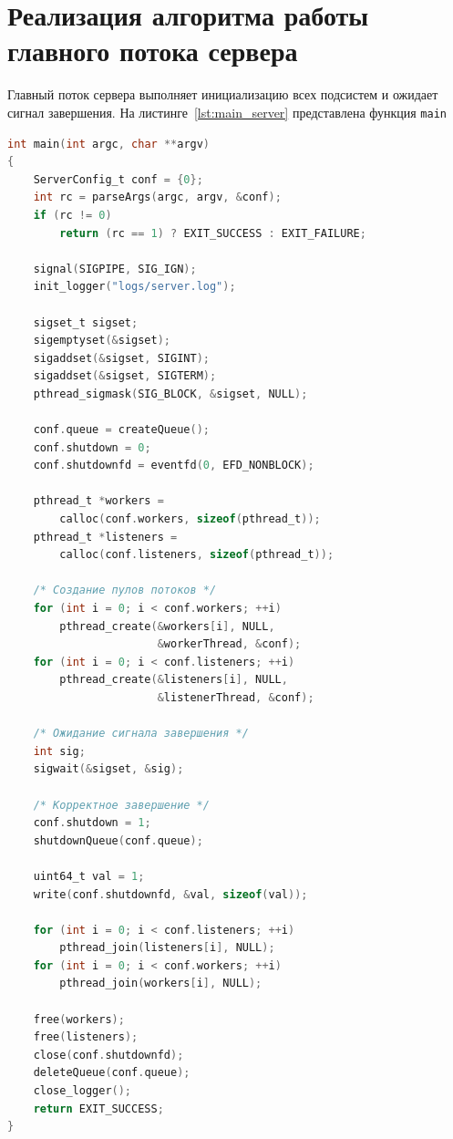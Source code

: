 \section{Реализация алгоритма работы главного потока сервера}
Главный поток сервера выполняет инициализацию всех подсистем
и ожидает сигнал завершения. На листинге~\ref{lst:main_server}
представлена функция \texttt{main}

\begin{lstlisting}[caption={Реализация функции главного потока сервера},label={lst:main_server},language=C]
int main(int argc, char **argv)
{
    ServerConfig_t conf = {0};
    int rc = parseArgs(argc, argv, &conf);
    if (rc != 0)
        return (rc == 1) ? EXIT_SUCCESS : EXIT_FAILURE;

    signal(SIGPIPE, SIG_IGN);
    init_logger("logs/server.log");

    sigset_t sigset;
    sigemptyset(&sigset);
    sigaddset(&sigset, SIGINT);
    sigaddset(&sigset, SIGTERM);
    pthread_sigmask(SIG_BLOCK, &sigset, NULL);

    conf.queue = createQueue();
    conf.shutdown = 0;
    conf.shutdownfd = eventfd(0, EFD_NONBLOCK);

    pthread_t *workers =
        calloc(conf.workers, sizeof(pthread_t));
    pthread_t *listeners =
        calloc(conf.listeners, sizeof(pthread_t));

    /* Создание пулов потоков */
    for (int i = 0; i < conf.workers; ++i)
        pthread_create(&workers[i], NULL,
                       &workerThread, &conf);
    for (int i = 0; i < conf.listeners; ++i)
        pthread_create(&listeners[i], NULL,
                       &listenerThread, &conf);

    /* Ожидание сигнала завершения */
    int sig;
    sigwait(&sigset, &sig);

    /* Корректное завершение */
    conf.shutdown = 1;
    shutdownQueue(conf.queue);

    uint64_t val = 1;
    write(conf.shutdownfd, &val, sizeof(val));

    for (int i = 0; i < conf.listeners; ++i)
        pthread_join(listeners[i], NULL);
    for (int i = 0; i < conf.workers; ++i)
        pthread_join(workers[i], NULL);

    free(workers);
    free(listeners);
    close(conf.shutdownfd);
    deleteQueue(conf.queue);
    close_logger();
    return EXIT_SUCCESS;
}
\end{lstlisting}

